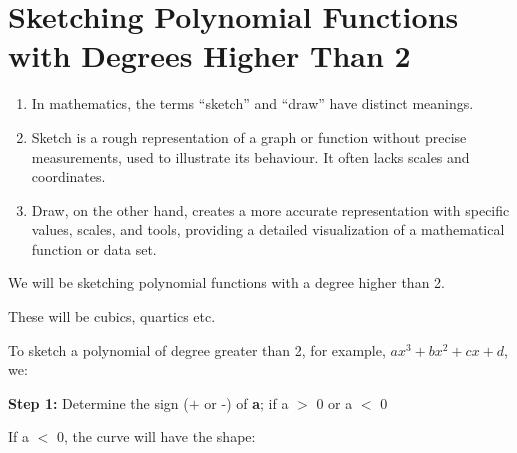 \section{Sketching Polynomial Functions with Degrees Higher Than 2}

\begin{enumerate}
  \item In mathematics, the terms ``sketch'' and ``draw'' have distinct meanings.
  \item Sketch is a rough representation of a graph or function without precise
  measurements, used to illustrate its behaviour. It often lacks scales and
  coordinates.
  \item Draw, on the other hand, creates a more accurate representation with
  specific values, scales, and tools, providing a detailed visualization of a
  mathematical function or data set.
\end{enumerate}

We will be sketching polynomial functions with a degree higher than 2.

These will be cubics, quartics etc.

To sketch a polynomial of degree greater than 2, for example, $ax^3 + bx^2 + cx + d$,
we:

\textbf{Step 1:} Determine the sign ($+$ or -) of \textbf{a}; if a $>$ 0 or a $<$ 0

If a $<$ 0, the curve will have the shape:
\begin{center}
\end{center}

